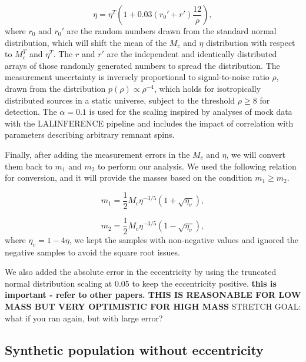 \documentclass[twocolumn,prd,nofootinbib]{revtex4}
\begin{document}
\begin{equation}
\eta = \eta^T\left( 1+0.03 (r_0'+r') \frac{12}{\rho}\right),   
\end{equation}
where $r_0$ and $r_0'$ are the random numbers drawn from the standard normal distribution, which will shift the mean of the $M_c$ and $\eta$ distribution with respect to $M_c^T$ and $\eta^T$. The $r$ and $r'$ are the independent and identically distributed arrays of those randomly generated numbers to spread the distribution. The measurement uncertainty is inversely proportional to signal-to-noise ratio $\rho$, drawn from the distribution $p(\rho) \propto \rho^{-4}$, which holds for isotropically distributed sources in a static universe, subject to the threshold $\rho\geq 8$ for detection. The $\alpha =0.1$ is used for the scaling inspired by analyses of mock data with the LALINFERENCE pipeline \cite{alpha_error_2015} and includes the impact of correlation with parameters describing arbitrary remnant spins.

Finally, after adding the measurement errors in the $M_c$ and $\eta$, we will convert them back to $m_1$ and $m_2$ to perform our analysis. We used the following relation for conversion, and it will provide the masses based on the condition $m_1\geq m_2$.

\begin{equation}
    m_1 = \frac{1}{2} M_c \eta^{-3/5} (1+\sqrt{\eta_v}),
\end{equation}

\begin{equation}
    m_2 = \frac{1}{2} M_c \eta^{-3/5} (1-\sqrt{\eta_v}), 
\end{equation}
where $\eta_v = 1-4\eta$, we kept the samples with non-negative values and ignored the negative samples to avoid the square root issues. 

We also added the absolute error in the eccentricity by using the truncated normal distribution scaling at $0.05$ to keep the eccentricity positive.
\textbf{this is important - refer to other papers.  THIS IS REASONABLE FOR LOW MASS BUT VERY OPTIMISTIC FOR HIGH MASS}
STRETCH GOAL: what if you ran again, but with large error?








\subsection{Synthetic population without eccentricity}
\end{document}
